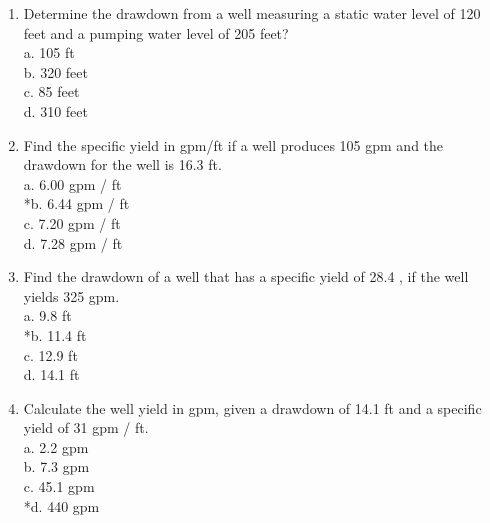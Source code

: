 \documentclass{article}
\begin{document}
\begin{enumerate}
\item Determine the drawdown from a well measuring a static water level of 120 feet and a pumping water level of 205 feet?\\
a. 105 ft\\
b. 320 feet\\
c. 85 feet\\
d. 310 feet\\


\item Find the specific yield in gpm/ft if a well produces 105 gpm and the drawdown for the well is 16.3 ft.\\
a. 6.00 gpm / ft\\
*b. 6.44 gpm / ft\\
c. 7.20 gpm / ft\\
d. 7.28 gpm / ft\\

\item Find the drawdown of a well that has a specific yield of 28.4 , if the well
yields 325 gpm.\\
a. 9.8 ft\\
*b. 11.4 ft\\
c. 12.9 ft\\
d. 14.1 ft\\

\item Calculate the well yield in gpm, given a drawdown of 14.1 ft and a specific
yield of 31 gpm / ft.\\
a. 2.2 gpm\\
b. 7.3 gpm\\
c. 45.1 gpm\\
*d. 440 gpm\\
\end{enumerate}
\end{document}
